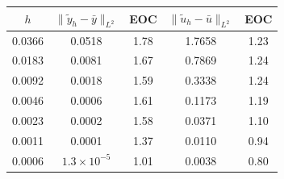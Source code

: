 {\begin{minipage}{0.5\textwidth}
\begin{tikzpicture}[scale=0.4]
\end{tikzpicture} 
\captionsetup{font=footnotesize}
\label{fig:error q09}
\end{minipage}
\hspace{-3mm}
\begin{minipage}{0.5\textwidth}
\footnotesize
\centering
\begin{tabular}{ccccc}
\hline
$h$ &$\|\tilde y_h -\bar y\|_{L^2}$ & EOC & $\|\tilde u_h -\bar u\|_{L^2}$ & EOC \\
\hline\hline
0.0366 & 0.0518 & 1.78 & 1.7658 & 1.23 \\\hline
0.0183 & 0.0081 & 1.67 & 0.7869 & 1.24 \\\hline
0.0092 & 0.0018 & 1.59 & 0.3338 & 1.24 \\\hline
0.0046 & 0.0006 & 1.61 & 0.1173 & 1.19 \\\hline
0.0023 & 0.0002 & 1.58& 0.0371 & 1.10 \\\hline
0.0011 &  0.0001 & 1.37 &0.0110 & 0.94 \\\hline
0.0006 &  $1.3\times 10^{-5}$& 1.01 & 0.0038 & 0.80 \\\hline
\end{tabular}
\captionsetup{font=footnotesize}
\label{tab:q09}
\end{minipage}





}
